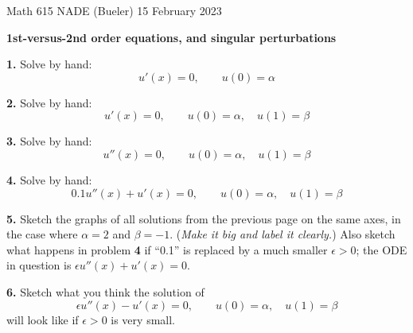 \documentclass[11pt]{amsart}
\newcommand{\eps}{\epsilon}
\newcommand{\prob}[1]{\bigskip\noindent\textbf{#1}\quad }
\begin{document}
\scriptsize \noindent Math 615 NADE (Bueler) \hfill 15 February 2023 \quad {}
\normalsize\medskip

\Large\centerline{\textbf{1st-versus-2nd order equations, and singular perturbations}}
\medskip
\normalsize

\thispagestyle{empty}

\medskip

\prob{1.} Solve by hand:
    $$u'(x) = 0, \qquad u(0) = \alpha$$
\vfill

\prob{2.} Solve by hand:
    $$u'(x) = 0, \qquad u(0) = \alpha, \quad u(1) = \beta$$
\vfill

\prob{3.} Solve by hand:
    $$u''(x) = 0, \qquad u(0) = \alpha, \quad u(1) = \beta$$
\vfill

\prob{4.} Solve by hand:
    $$0.1 u''(x) + u'(x) = 0, \qquad u(0) = \alpha, \quad u(1) = \beta$$
\vspace{3.0in}

\clearpage
\newpage
\prob{5.}  Sketch the graphs of all solutions from the previous page on the same axes, in the case where $\alpha=2$ and $\beta=-1$.  (\emph{Make it big and label it clearly.})  Also sketch what happens in problem \textbf{4} if ``0.1'' is replaced by a much smaller $\eps>0$; the ODE in question is $\eps u''(x) + u'(x) = 0$.
\vfill

\prob{6.}  Sketch what you think the solution of
    $$\eps u''(x) - u'(x) = 0, \qquad u(0) = \alpha, \quad u(1) = \beta$$
will look like if $\eps>0$ is very small.
\vspace{3.0in}
\end{document}
